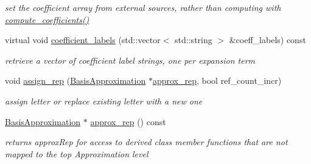 \begin{DoxyCompactItemize}
\begin{DoxyCompactList}\small\item\em set the coefficient array from external sources, rather than computing with \hyperlink{classPecos_1_1BasisApproximation_aef8f0c32bdeff7756a9c614607c03058}{compute\+\_\+coefficients()} \end{DoxyCompactList}\item 
virtual void \hyperlink{classPecos_1_1BasisApproximation_a36020c0cf988e1af9f0e154af745f995}{coefficient\+\_\+labels} (std\+::vector$<$ std\+::string $>$ \&coeff\+\_\+labels) const \label{classPecos_1_1BasisApproximation_a36020c0cf988e1af9f0e154af745f995}

\begin{DoxyCompactList}\small\item\em retrieve a vector of coefficient label strings, one per expansion term \end{DoxyCompactList}\item 
void \hyperlink{classPecos_1_1BasisApproximation_a410dc797e6d458e8dde15e90802a6409}{assign\+\_\+rep} (\hyperlink{classPecos_1_1BasisApproximation}{Basis\+Approximation} $\ast$\hyperlink{classPecos_1_1BasisApproximation_a33f0a9133acdb15491e3288d92516d3a}{approx\+\_\+rep}, bool ref\+\_\+count\+\_\+incr)\label{classPecos_1_1BasisApproximation_a410dc797e6d458e8dde15e90802a6409}

\begin{DoxyCompactList}\small\item\em assign letter or replace existing letter with a new one \end{DoxyCompactList}\item 
\hyperlink{classPecos_1_1BasisApproximation}{Basis\+Approximation} $\ast$ \hyperlink{classPecos_1_1BasisApproximation_a33f0a9133acdb15491e3288d92516d3a}{approx\+\_\+rep} () const \label{classPecos_1_1BasisApproximation_a33f0a9133acdb15491e3288d92516d3a}

\begin{DoxyCompactList}\small\item\em returns approx\+Rep for access to derived class member functions that are not mapped to the top Approximation level \end{DoxyCompactList}\end{DoxyCompactItemize}
